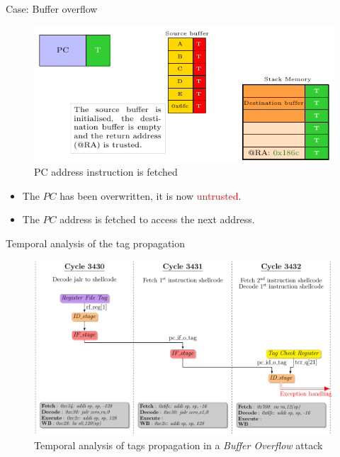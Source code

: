 \begin{frame}{Case: Buffer overflow}
    \begin{figure}
        \centering
        \includegraphics[width=.5\textwidth, page=5]{src/2_vuln_assessment/img/buffer_overflow/schemaPedagogique.pdf}
        \caption{PC address instruction is fetched}
        \label{fig:bo_5th_step}
    \end{figure}

    \begin{itemize}
        \item The $PC$ has been overwritten, it is now \textcolor{red}{untrusted}.
        \item The $PC$ address is fetched to access the next address.
    \end{itemize}
\end{frame}

\begin{frame}{Temporal analysis of the tag propagation}
    \begin{figure}
        \centering
        \includegraphics[width=.75\textwidth]{src/2_vuln_assessment/img/buffer_overflow/bufferOverflowAttack_short.pdf}
        \caption{Temporal analysis of tags propagation in a \textit{Buffer Overflow} attack}
        \label{fig:analyseTempoBufferOverflow}
    \end{figure}
\end{frame}

